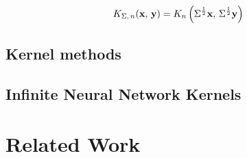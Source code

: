 \begin{equation}\label{eq:kernel_pandey}
K_{\Sigma,\,n}(\mathbf{x},\,\mathbf{y}) = K_{n}\left(\Sigma^{\frac{1}{2}}\mathbf{x},\,\Sigma^{\frac{1}{2}}\mathbf{y}\right)
\end{equation}

\subsection{Kernel methods}%
\label{sub:kernel_methods}

\subsection{Infinite Neural Network Kernels}%

\section{Related Work}%
\label{sec:related_work}




